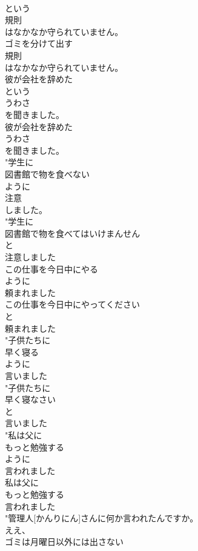 \documentclass[8pt]{extreport}
\begin{document}
\begin{CJK}{UTF8}{min}
\\	という
\\	規則
\\	はなかなか守られていません。
\\	ゴミを分けて出す
\\	規則
\\	はなかなか守られていません。
\\	彼が会社を辞めた
\\	という
\\	うわさ
\\	を聞きました。
\\	彼が会社を辞めた
\\	うわさ
\\	を聞きました。
\\	"学生に
\\	図書館で物を食べない
\\	ように
\\	注意
\\	しました。
\\	"学生に
\\	図書館で物を食べてはいけまんせん
\\	と
\\	注意しました
\\	この仕事を今日中にやる
\\	ように
\\	頼まれました
\\	この仕事を今日中にやってください
\\	と
\\	頼まれました
\\	"子供たちに
\\	早く寝る
\\	ように
\\	言いました
\\	"子供たちに
\\	早く寝なさい
\\	と
\\	言いました
\\	"私は父に
\\	もっと勉強する
\\	ように
\\	言われました
\\	私は父に
\\	もっと勉強する
\\	言われました
\\	"管理人[かんりにん]さんに何か言われたんですか。
\\	ええ、
\\	ゴミは月曜日以外には出さない

\end{CJK}
\end{document}
